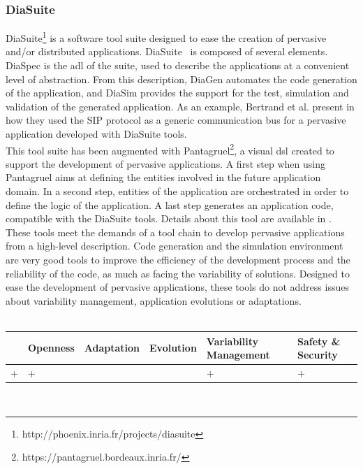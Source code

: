 \subsubsection{DiaSuite}
DiaSuite\footnote{http://phoenix.inria.fr/projects/diasuite} is a software tool suite designed to ease the creation of pervasive and/or distributed applications. DiaSuite~\cite{CASSOU:2010} is composed of several elements. DiaSpec is the \gls{adl} of the suite, used to describe the applications at a convenient level of abstraction. From this description, DiaGen automates the code generation of the application, and DiaSim provides the support for the test, simulation and validation of the generated application. As an example, Bertrand et al. present in \cite{BERTRAN:2010} how they used the SIP protocol as a generic communication bus for a pervasive application developed with DiaSuite tools.\\
This tool suite has been augmented with Pantagruel\footnote{https://pantagruel.bordeaux.inria.fr/}, a visual \gls{dsl} created to support the development of pervasive applications. A first step when using Pantagruel aims at defining the entities involved in the future application domain. In a second step, entities of the application are orchestrated in order to define the logic of the application. A last step generates an application code, compatible with the DiaSuite tools. Details about this tool are available in \cite{DREY:2009}.\\


These tools meet the demands of a tool chain to develop pervasive applications from a high-level description. Code generation and the simulation environment are very good tools to improve the efficiency of the development process and the reliability of the code, as much as facing the variability of solutions. Designed to ease the development of pervasive applications, these tools do not address issues about variability management, application evolutions or adaptations.\\
\\
\begin{tabular}{ >{\centering}m{}| >{\centering}m{} >{\centering}m{}| >{\centering}m{} >{\centering}m{}| >{\centering\arraybackslash}m{}}
{\tiny Interoperability} & {\tiny Openness} & {\tiny Adaptation} & {\tiny Evolution} & {\tiny Variability Management} & {\tiny Safety \& Security}\\
 \hline
 + & + &  &  & + & + \\ 
  \hline
\end{tabular}\\


